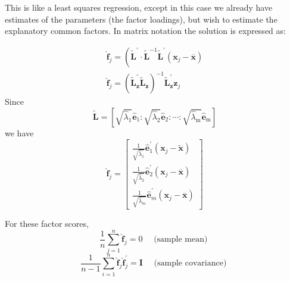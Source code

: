 \documentclass[12]{article}
\begin{document}
\noindent This is like a least squares regression, except in this case we already have
estimates of the parameters (the factor loadings), but wish to estimate the
explanatory common factors. In matrix notation the solution is expressed as:

$$
\begin{gathered}
	\hat{\mathbf{f}}_j=\left(\tilde{\mathbf{L}}^{\prime} \cdot \tilde{\mathbf{L}}^{-1} \widetilde{\mathbf{L}}^{\prime}\left(\mathbf{x}_j-\overline{\mathbf{x}}\right)\right. \\
	\hat{\mathbf{f}}_j=\left(\tilde{\mathbf{L}}_{\mathbf{z}}^{\prime} \tilde{\mathbf{L}}_{\mathbf{z}}\right)^{-1} \widetilde{\mathbf{L}}_{\mathbf{z}}^{\prime} \mathbf{z}_j
\end{gathered}
$$
Since 
$$
\tilde{\mathbf{L}}=\left[\sqrt{\hat{\lambda}_1} \hat{\mathbf{e}}_1: \sqrt{\hat{\lambda}_2} \hat{\mathbf{e}}_2: \cdots: \sqrt{\hat{\lambda}_{\mathrm{m}}} \hat{\mathbf{e}}_{\mathrm{m}}\right]
$$
we have
$$
\hat{\mathbf{f}}_j=\left[\begin{array}{c}
	\frac{1}{\sqrt{\hat{\lambda}_1}} \hat{\mathbf{e}}_1^{\prime}\left(\mathbf{x}_j-\tilde{\mathbf{x}}\right) \\
	\frac{1}{\sqrt{\hat{\lambda}_2}} \hat{\mathbf{e}}_2^{\prime}\left(\mathbf{x}_j-\overline{\mathbf{x}}\right) \\
	\frac{1}{\sqrt{\hat{\lambda}_m}} \hat{\mathbf{e}}_m^{\prime}\left(\mathbf{x}_j-\overline{\mathbf{x}}\right)
\end{array}\right]
$$

For these factor scores,
$$
\frac{1}{n} \sum_{j=1}^n \hat{\mathbf{f}}_j=0 \quad \text { (sample mean) }
$$
$$
\frac{1}{n-1} \sum_{i=1}^n \hat{\mathbf{f}}_j \hat{\mathbf{f}}_j^{\prime}=\mathbf{I} \quad \text { (sample covariance) }
$$
\end{document}
